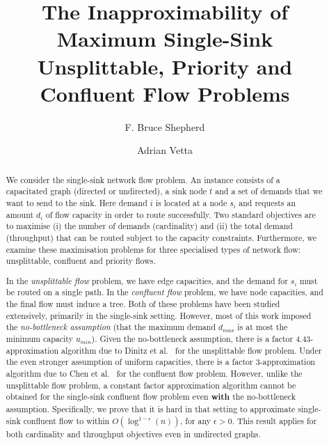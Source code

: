 \documentclass[12pt]{article}
\begin{document}







\title{The Inapproximability of Maximum Single-Sink\\ Unsplittable, Priority and Confluent Flow Problems}
\author{F. Bruce Shepherd \and Adrian Vetta}

\maketitle


\begin{abstract}
We consider the  single-sink network flow problem.
An instance consists of a capacitated graph (directed or undirected),
a sink node $t$ and a set of demands that we want to send to the
sink. Here demand $i$ is located at a node $s_i$ and
requests an amount $d_i$ of flow capacity in order to route successfully.
Two standard objectives are to maximise
(i) the number of demands (cardinality) and (ii) the total demand (throughput)
that can be routed subject to the capacity constraints. Furthermore, we examine these maximisation
problems for three specialised types of network flow: unsplittable, confluent and priority flows.

In the {\em unsplittable flow} problem, we have edge capacities, and the demand for $s_i$ must be
routed on a single path. In the {\em confluent flow} problem, we have node capacities, and the final
flow must induce a tree.
Both of these problems have been studied extensively, primarily in the
single-sink setting. However, most of this work imposed the {\em no-bottleneck assumption}
(that the maximum demand $d_{max}$ is at most the minimum capacity $u_{min}$).
Given the no-bottleneck assumption, there is a factor $4.43$-approximation algorithm due to Dinitz et al.~\cite{Dinitz99}
for the unsplittable flow problem. Under the even stronger assumption of uniform capacities,
there is a factor $3$-approximation algorithm due to Chen et al.~\cite{Chen07} for the confluent flow problem.
However, unlike the unsplittable flow problem, a constant factor approximation algorithm cannot
be obtained for the single-sink confluent flow problem even {\bf with} the no-bottleneck assumption.
Specifically, we prove that it is hard in that setting to approximate single-sink confluent flow to
within $O(\log^{1-\epsilon}(n))$, for any $\epsilon>0$.
This result applies for both cardinality and throughput objectives even in undirected graphs.


\end{abstract}
\end{document}
